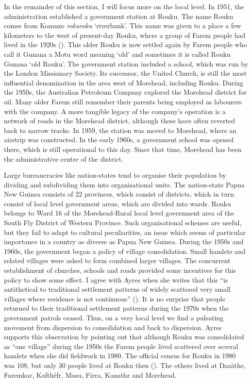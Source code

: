 In the remainder of this section, I will focus more on the local level. In 1951, the administration established a government station at Rouku. The name Rouku comes from Komnzo \emph{rokuroku} `riverbank'. This name was given to a place a few kilometers to the west of present-day Rouku, where a group of Farem people had lived in the 1920s (\citealt[14]{Ayres:ws}). This older Rouku is now settled again by Farem people who call it Gunana {\textendash} a Motu word meaning `old' {\textendash} and sometimes it is called Rouku Gunana `old Rouku'. The government station included a school, which was run by the London Missionary Society. Its successor, the United Church, is still the most influential denomination in the area west of Morehead, including Rouku. During the 1950s, the Australian Petroleum Company explored the Morehead district for oil. Many older Farem still remember their parents being employed as labourers with the company. A more tangible legacy of the company's operation is a network of roads in the Morehead district, although these have often reverted back to narrow tracks. In 1959, the station was moved to Morehead, where an airstrip was constructed. In the early 1960s, a government school was opened there, which is still operational to this day. Since that time, Morehead has been the administrative centre of the district.

Large bureaucracies like nation-states tend to organise their population by dividing and subdividing them into organisational units. The nation-state Papua New Guinea consists of 22 provinces, which consist of districts, which in turn consist of local level government areas, which are divided into wards. Rouku belongs to Ward 16 of the Morehead-Rural local level government area of the South Fly District of Western Province. Such organisational schemes are useful, but they fail to adapt to cultural peculiarities, an issue which seems of particular importance in a country as diverse as Papua New Guinea. During the 1950s and 1960s, the government began a policy of village consolidation. Small hamlets and related villages were asked to form combined larger villages. The concurrent establishment of churches, schools and roads provided some incentives for this policy to show some effect. I agree with Ayres when she writes that this ``is antithetical to traditional settlement patterns of widely scattered very small villages where residence is not continuous'' (\citeyear[17]{Ayres:ws}). It is no surprise that people returned to their traditional settlement patterns during the 1970s when the government patrols ceased. Thus, on a very local level we find a pulsating movement from dispersion to consolidation and back to dispersion. Ayres supports this observation by pointing out that {\textendash} although Rouku was consolidated as ``one village'' during the 1950s {\textendash} the Farem people lived scattered over several hamlets when she did fieldwork in 1980. The official census for Rouku in 1980 was 108, but only 30 people lived at Rouku then (\citeyear[17]{Ayres:ws}). The others lived at Ŋazäthe, Faremkar, Kafthéfr, Masu, Firra, Kanathr and Morehead.

